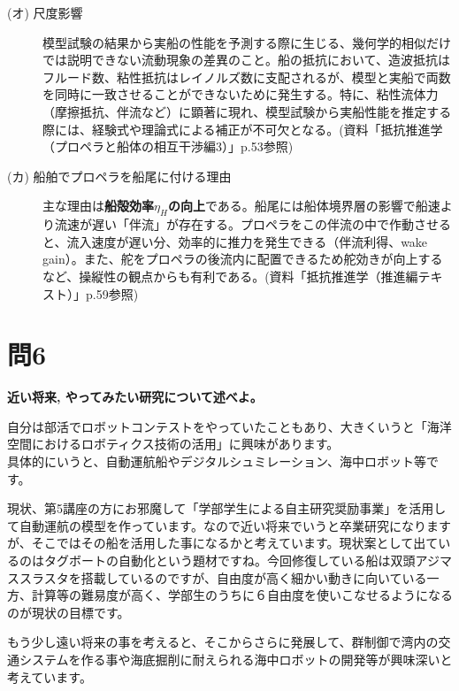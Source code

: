 \documentclass[12pt, a4paper, leqno, dvipdfmx]{jarticle}
\begin{document}
\begin{description}
    \item[(オ) 尺度影響] 
    
    模型試験の結果から実船の性能を予測する際に生じる、幾何学的相似だけでは説明できない流動現象の差異のこと。船の抵抗において、造波抵抗はフルード数、粘性抵抗はレイノルズ数に支配されるが、模型と実船で両数を同時に一致させることができないために発生する。特に、粘性流体力（摩擦抵抗、伴流など）に顕著に現れ、模型試験から実船性能を推定する際には、経験式や理論式による補正が不可欠となる。(資料「抵抗推進学（プロペラと船体の相互干渉編3）」p.53参照)
    \item[(カ) 船舶でプロペラを船尾に付ける理由] 
    
    主な理由は\textbf{船殻効率$\eta_H$の向上}である。船尾には船体境界層の影響で船速より流速が遅い「伴流」が存在する。プロペラをこの伴流の中で作動させると、流入速度が遅い分、効率的に推力を発生できる（伴流利得、wake gain）。また、舵をプロペラの後流内に配置できるため舵効きが向上するなど、操縦性の観点からも有利である。(資料「抵抗推進学（推進編テキスト）」p.59参照)
\end{description}

\newpage
\section*{問6}
\textbf{近い将来, やってみたい研究について述べよ。}

\vspace{5mm}

自分は部活でロボットコンテストをやっていたこともあり、大きくいうと「海洋空間におけるロボティクス技術の活用」に興味があります。\\具体的にいうと、自動運航船やデジタルシュミレーション、海中ロボット等です。

現状、第5講座の方にお邪魔して「学部学生による自主研究奨励事業」を活用して自動運航の模型を作っています。なので近い将来でいうと卒業研究になりますが、そこではその船を活用した事になるかと考えています。現状案として出ているのはタグボートの自動化という題材ですね。今回修復している船は双頭アジマススラスタを搭載しているのですが、自由度が高く細かい動きに向いている一方、計算等の難易度が高く、学部生のうちに６自由度を使いこなせるようになるのが現状の目標です。

もう少し遠い将来の事を考えると、そこからさらに発展して、群制御で湾内の交通システムを作る事や海底掘削に耐えられる海中ロボットの開発等が興味深いと考えています。
\end{document}
